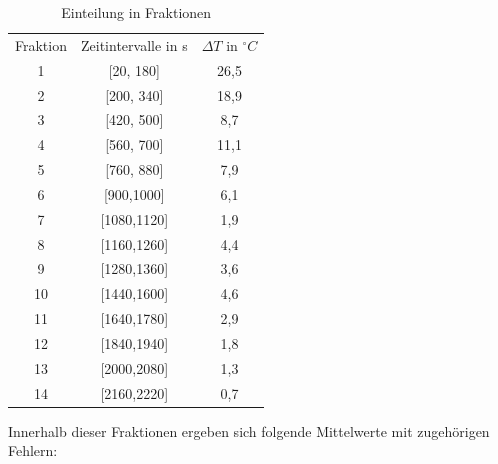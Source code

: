 \begin{table}
\begin{tabular}{|c|c|c|}

Fraktion&	Zeitintervalle in s	& $\Delta T $ in $ ^{\circ} C$ \\

1		&[20, 180]		&26,5\\

2		&[200, 340]		&18,9\\

3		&[420, 500]		&8,7\\

4		&[560, 700]		&11,1\\

5		&[760, 880]		&7,9\\

6		&[900,1000]		&6,1\\

7		&[1080,1120]		&1,9\\

8		&[1160,1260]		&4,4\\

9		&[1280,1360]		&3,6\\

10		&[1440,1600]		&4,6\\

11		&[1640,1780]		&2,9\\

12		&[1840,1940]		&1,8\\

13		&[2000,2080]		&1,3\\

14		&[2160,2220]		&0,7\\

\end{tabular}

\caption{Einteilung in Fraktionen}
\label{tbl_2}
\end{table}



Innerhalb dieser Fraktionen ergeben sich folgende Mittelwerte mit zugehörigen Fehlern:

